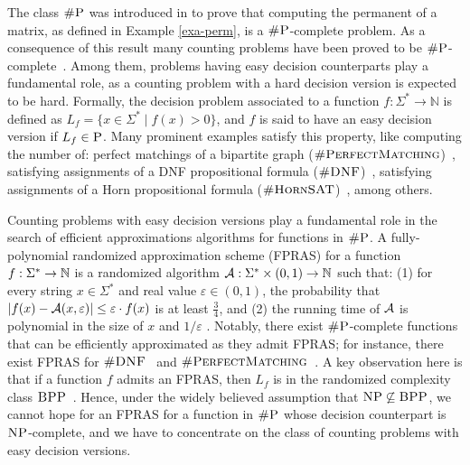 
The class $\text{\sc \#P}$ was introduced in \cite{Valiant79} to prove that computing the permanent of a matrix, as defined in Example \ref{exa-perm}, is a $\text{\sc \#P}$-complete problem.
As a consequence of this result many counting problems have been proved to be $\text{\sc \#P}$-complete~\cite{V79b,arora2009computational}.
Among them, problems having easy decision counterparts play a fundamental role, as a counting problem with a hard decision version is expected to be hard. Formally, the decision problem associated to a function $f : \Sigma^* \to \mathbb{N}$ is defined as $L_f = \{ x \in \Sigma^* \mid f(x) > 0 \}$, and $f$ is said to have an easy decision version if $L_f \in \text{\sc P}$. 
Many prominent examples satisfy this property, like computing the number of: perfect matchings of a bipartite graph ($\textsc{\#PerfectMatching}$)~\cite{Valiant79}, satisfying assignments of a DNF propositional formula ($\textsc{\#DNF}$)~\cite{DHK05}, satisfying assignments of a Horn  propositional formula ($\textsc{\#HornSAT}$)~\cite{V79b}, among others.

Counting problems with easy decision versions play a fundamental role in the search of efficient approximations algorithms for functions in $\text{\sc \#P}$. A fully-polynomial randomized approximation scheme (FPRAS) for a function $f : \Sigma^* \to \mathbb{N}$ is a randomized algorithm ${\cal A} : \Sigma^* \times (0,1) \to \bbN$ such that: (1) for every string $x \in \Sigma^*$ and real value $\varepsilon \in (0,1)$, the probability that $|f(x) - {\cal A}(x,\varepsilon)| \leq \varepsilon \cdot f(x)$ is at least $\frac{3}{4}$, and (2) the running time of ${\cal A}$ is polynomial in the size of $x$ and $1/\varepsilon$ \cite{KL83}. Notably, there exist $\text{\sc \#P}$-complete functions that can be efficiently approximated as they admit FPRAS; for instance, there exist FPRAS for $\textsc{\#DNF}$~\cite{KL83} and $\textsc{\#PerfectMatching}$~\cite{JSV04}. A key observation here is that if a function $f$ admits an FPRAS, then $L_f$ is in the randomized complexity class $\text{\sc BPP}$~\cite{G77}. Hence, under the widely believed assumption that  $\text{\sc NP} \not\subseteq \text{\sc BPP}$, we cannot hope for an FPRAS for a function in $\text{\sc \#P}$ whose decision counterpart is $\text{\sc NP}$-complete, and we have to concentrate on the class of counting problems with easy decision versions.

